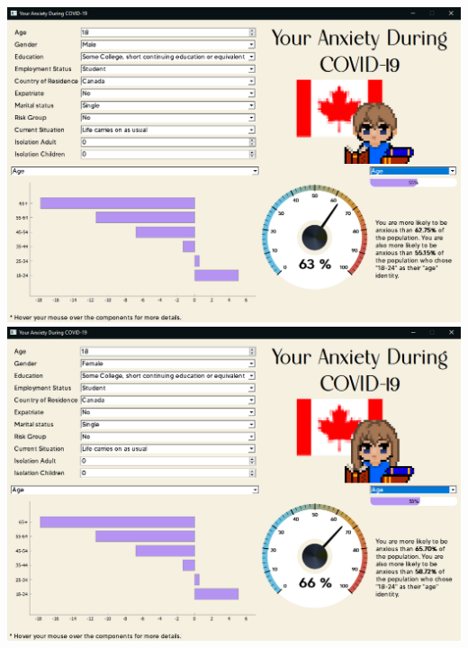 \documentclass[fontsize=11pt]{article}
\begin{document}
	\begin{center}
		\includegraphics[scale=0.30]{img/male_student_screenshot}
		\includegraphics[scale=0.30]{img/female_student_screenshot}
	\end{center}
\end{document}
